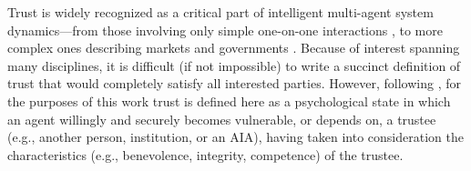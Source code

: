 
    Trust is widely recognized as a critical part of %
    intelligent multi-agent system dynamics---from those involving only simple one-on-one interactions \cite{Lewicki2006-hj}, to more complex ones describing markets and governments \cite{Fukuyama1995-un}. 
    Because of interest spanning many disciplines, it is difficult (if not impossible) to write a succinct definition of trust that would completely satisfy all interested parties. 
    However, following \cite{McKnight2004-vv}, for the purposes of this work trust is defined here as a psychological state in which an agent willingly and securely becomes vulnerable, or depends on, a trustee (e.g., another person, institution, or an AIA), having taken into consideration the characteristics (e.g., benevolence, integrity, competence) of the trustee. 

